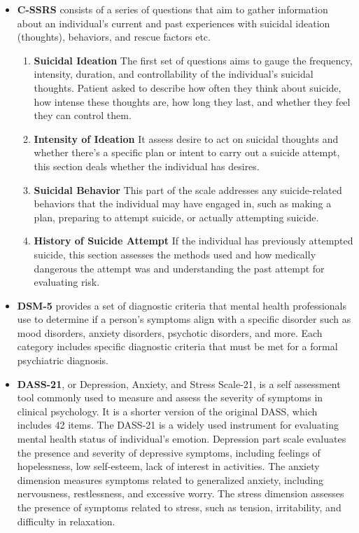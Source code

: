 \documentclass[sn-mathphys,Numbered]{sn-jnl}%
\theoremstyle{thmstyleone}%
\theoremstyle{thmstyletwo}%
\theoremstyle{thmstylethree}%
\begin{document}
\begin{itemize}
\item
\textbf{C-SSRS} consists of a series of questions that aim to gather information about an individual's current and past experiences with suicidal ideation (thoughts), behaviors, and rescue factors etc.

\begin{enumerate}[label=(\roman*)]
\item  
\textbf{Suicidal Ideation}
The first set of questions aims to gauge the frequency, intensity, duration, and controllability of the individual's suicidal thoughts. Patient asked to describe how often they think about suicide, how intense these thoughts are, how long they last, and whether they feel they can control them.
\item
\textbf{Intensity of Ideation}
It assess desire to act on suicidal thoughts and whether there's a specific plan or intent to carry out a suicide attempt, this section deals whether the individual has desires. 
\item
\textbf{Suicidal Behavior}
This part of the scale addresses any suicide-related behaviors that the individual may have engaged in, such as making a plan, preparing to attempt suicide, or actually attempting suicide.
\item 
\textbf{History of Suicide Attempt}
If the individual has previously attempted suicide, this section assesses the methods used and how medically dangerous the attempt was and understanding the past attempt for evaluating risk.
\end{enumerate}  
\item 
\textbf{DSM-5} \cite{havigerova2019text} provides a set of diagnostic criteria that mental health professionals use to determine if a person's symptoms align with a specific disorder such as mood disorders, anxiety disorders, psychotic disorders, and more. Each category includes specific diagnostic criteria that must be met for a formal psychiatric diagnosis.
\item 
\textbf{DASS-21}, or Depression, Anxiety, and Stress Scale-21, is a self assessment tool \cite{henry2005short} commonly used to measure and assess the severity of symptoms in clinical psychology. It is a shorter version of the original DASS, which includes 42 items. The DASS-21 is a widely used instrument for evaluating mental health status of individual's emotion. Depression part scale evaluates the presence and severity of depressive symptoms, including feelings of hopelessness, low self-esteem, lack of interest in activities. The anxiety dimension measures symptoms related to generalized anxiety, including nervousness, restlessness, and excessive worry. The stress dimension assesses the presence of symptoms related to stress, such as tension, irritability, and difficulty in relaxation. 

\end{itemize}
\end{document}
